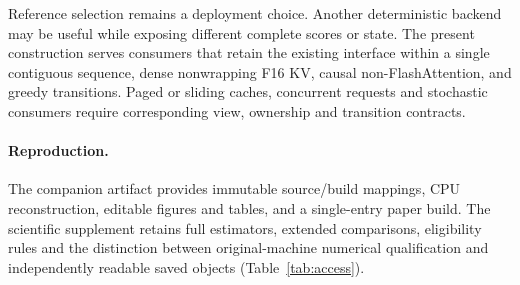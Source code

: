 Reference selection remains a deployment choice. Another deterministic backend may be useful while exposing different complete scores or state. The present construction serves consumers that retain the existing interface within a single contiguous sequence, dense nonwrapping F16 KV, causal non-FlashAttention, and greedy transitions. Paged or sliding caches, concurrent requests and stochastic consumers require corresponding view, ownership and transition contracts.

\paragraph{Reproduction.}\label{sec:repro}
The companion artifact provides immutable source/build mappings, CPU reconstruction, editable figures and tables, and a single-entry paper build. The scientific supplement retains full estimators, extended comparisons, eligibility rules and the distinction between original-machine numerical qualification and independently readable saved objects (Table~\ref{tab:access}).
